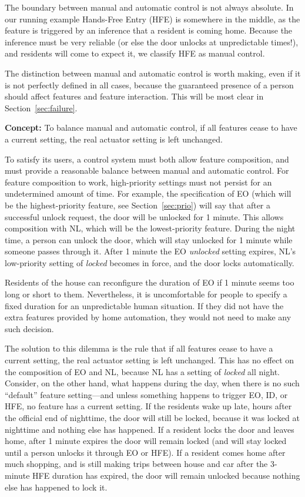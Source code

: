 \documentclass[conference]{IEEEtran}
\begin{document}
The boundary between manual and automatic control is not always absolute.
In our running example Hands-Free
Entry (HFE) is somewhere in the middle, as the feature is triggered
by an inference that a resident is coming home.
Because the inference must be very reliable (or else the door unlocks
at unpredictable times!), and residents will come to expect it,
we classify HFE as manual control. 

The distinction between manual and automatic control is worth making,
even if it is not perfectly defined in all cases,
because the guaranteed presence of a person should affect features and
feature interaction.
This will be most clear in Section~\ref{sec:failure}.

\vspace{2mm}
{\bf Concept:}
To balance manual and automatic control, 
if all features cease to have a current setting, the real
actuator setting is left unchanged.

To satisfy its users, a control system must both allow feature composition,
and must provide a reasonable balance between manual and automatic
control.
For feature composition to work, high-priority settings must not
persist for an undetermined amount of time.
For example, the specification of EO (which will be the
highest-priority feature, see Section~\ref{sec:prio}) will say that
after a successful unlock request, the door will be unlocked for 1 minute.
This allows composition with NL, which will be the lowest-priority
feature.
During the night time, a person can unlock the door, which will stay
unlocked for 1 minute while someone passes through it.
After 1 minute the EO {\it unlocked}
setting expires, NL's low-priority setting
of {\it locked} becomes in force, and the door locks automatically.

Residents of the house can reconfigure the duration of EO if 1 minute
seems too long or short to them.
Nevertheless, it is uncomfortable for people to specify a fixed duration
for an unpredictable human situation.
If they did not have the extra features provided by home automation,
they would not need to make any such decision.

The solution to this dilemma is the rule that
if all features cease to have a current setting, the real
actuator setting is left unchanged.
This has no effect on the composition of EO and NL, because NL has a
setting of {\it locked} all night.
Consider, on the other hand, what happens during the day, when there
is no such ``default'' feature setting---and unless something happens
to trigger EO, ID, or HFE, no feature has a current setting.
If the residents wake up late, hours after the official end of nighttime,
the door will still be locked, because it was locked at nighttime and
nothing else has happened.
If a resident locks the door and leaves home, after 1 minute expires
the door will remain locked (and will stay locked until a person unlocks
it through EO or HFE).
If a resident comes home after much shopping,
and is still making trips between house and car after the 
3-minute HFE duration
has expired, the door will remain unlocked because nothing else has
happened to lock it.
\end{document}
